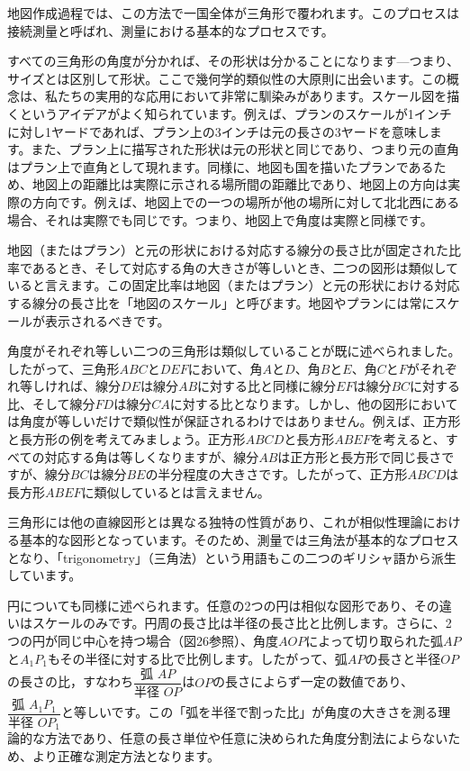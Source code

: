 \documentclass[a4paper,11pt,openany]{ltjsbook}
\begin{document}
地図作成過程では、この方法で一国全体が三角形で覆われます。このプロセスは接続測量と呼ばれ、測量における基本的なプロセスです。

すべての三角形の角度が分かれば、その形状は分かることになります---つまり、サイズとは区別して形状。ここで幾何学的類似性の大原則に出会います。この概念は、私たちの実用的な応用において非常に馴染みがあります。スケール図を描くというアイデアがよく知られています。例えば、プランのスケールが1インチに対し1ヤードであれば、プラン上の3インチは元の長さの3ヤードを意味します。また、プラン上に描写された形状は元の形状と同じであり、つまり元の直角はプラン上で直角として現れます。同様に、地図も国を描いたプランであるため、地図上の距離比は実際に示される場所間の距離比であり、地図上の方向は実際の方向です。例えば、地図上での一つの場所が他の場所に対して北北西にある場合、それは実際でも同じです。つまり、地図上で角度は実際と同様です。

地図（またはプラン）と元の形状における対応する線分の長さ比が固定された比率であるとき、そして対応する角の大きさが等しいとき、二つの図形は類似していると言えます。この固定比率は地図（またはプラン）と元の形状における対応する線分の長さ比を「地図のスケール」と呼びます。地図やプランには常にスケールが表示されるべきです。

角度がそれぞれ等しい二つの三角形は類似していることが既に述べられました。したがって、三角形$ABC$と$DEF$において、角$A$と$D$、角$B$と$E$、角$C$と$F$がそれぞれ等しければ、線分$DE$は線分$AB$に対する比と同様に線分$EF$は線分$BC$に対する比、そして線分$FD$は線分$CA$に対する比となります。しかし、他の図形においては角度が等しいだけで類似性が保証されるわけではありません。例えば、正方形と長方形の例を考えてみましょう。正方形$ABCD$と長方形$ABEF$を考えると、すべての対応する角は等しくなりますが、線分$AB$は正方形と長方形で同じ長さですが、線分$BC$は線分$BE$の半分程度の大きさです。したがって、正方形$ABCD$は長方形$ABEF$に類似しているとは言えません。

三角形には他の直線図形とは異なる独特の性質があり、これが相似性理論における基本的な図形となっています。そのため、測量では三角法が基本的なプロセスとなり、「trigonometry」（三角法）という用語もこの二つのギリシャ語から派生しています。

円についても同様に述べられます。任意の2つの円は相似な図形であり、その違いはスケールのみです。円周の長さ比は半径の長さ比と比例します。さらに、2つの円が同じ中心を持つ場合（図26参照）、角度$AOP$によって切り取られた弧$AP$と$A_{1}P_{1}$もその半径に対する比で比例します。したがって、弧$AP$の長さと半径$OP$の長さの比，すなわち$\dfrac{\text{弧 } AP}{\text{半径 } OP}$は$OP$の長さによらず一定の数値であり、$\dfrac{\text{弧 } A_{1}P_{1}}{\text{半径 } OP_{1}}$と等しいです。この「弧を半径で割った比」が角度の大きさを測る理論的な方法であり、任意の長さ単位や任意に決められた角度分割法によらないため、より正確な測定方法となります。
\end{document}
